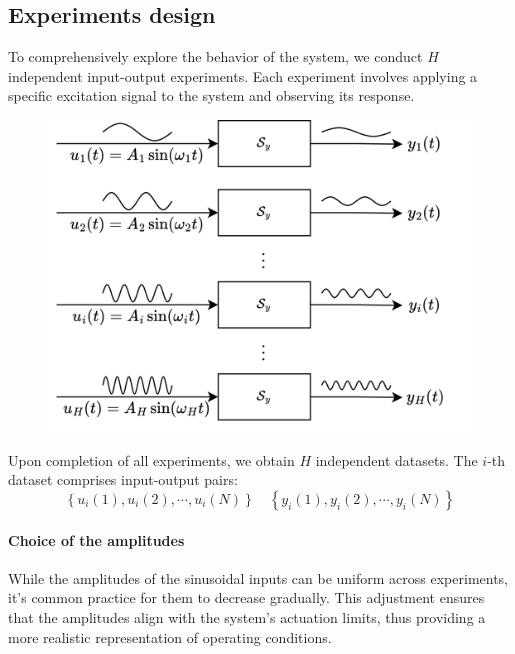 \subsection{Experiments design}
To comprehensively explore the behavior of the system, we conduct $H$ independent input-output experiments. 
Each experiment involves applying a specific excitation signal to the system and observing its response. 
\begin{figure}[H]
    \centering
    \includegraphics[width=0.6\linewidth]{images/exp.png}
\end{figure}
Upon completion of all experiments, we obtain $H$ independent datasets. 
The $i$-th dataset comprises input-output pairs:
\[\left\{u_i(1),u_i(2),\cdots, u_i(N)\right\} \quad \left\{y_i(1),y_i(2),\cdots, y_i(N)\right\}\]

\paragraph*{Choice of the amplitudes}
While the amplitudes of the sinusoidal inputs can be uniform across experiments, it's common practice for them to decrease gradually. 
This adjustment ensures that the amplitudes align with the system's actuation limits, thus providing a more realistic representation of operating conditions.

